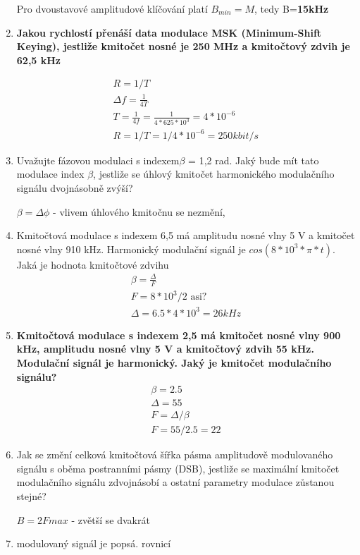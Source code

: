 \begin{enumerate}
    Pro dvoustavové amplitudové klíčování platí $B_{min}=M$, tedy B=\textbf{15kHz}
    \item \textbf{
    Jakou rychlostí přenáší data modulace MSK (Minimum-Shift Keying), jestliže kmitočet nosné 
je 250 MHz a kmitočtový zdvih je 62,5 kHz}

\begin{align*}
    R=1/T \\
    \Delta f= \frac{1}{4T}\\
    T = \frac{1}{4f}=\frac{1}{4*625*10^3}=4*10^{-6} \\
    R=1/T=1/4*10^{-6}=250kbit/s
\end{align*}

    \item Uvažujte fázovou modulaci s indexem$\beta$ = 1,2 rad. Jaký bude mít tato modulace index $\beta$, 
jestliže se úhlový kmitočet harmonického modulačního signálu dvojnásobně zvýší?

    $\beta = \Delta\phi$ - vlivem úhlového kmitočnu se nezmění,
    
    \item Kmitočtová modulace s indexem 6,5 má amplitudu nosné vlny 5 V a kmitočet nosné vlny 910 kHz. Harmonický modulační signál je $cos(8*10^3*\pi*t)$. Jaká je hodnota kmitočtové zdvihu
    \begin{align*}
        \beta=\frac{\Delta}{F} \\
        F= 8*10^3/2 \textrm{ asi?}\\
        \Delta=6.5*4*10^3= 26kHz
    \end{align*}
    \item \textbf{Kmitočtová modulace s indexem 2,5 má kmitočet nosné vlny 900 kHz, amplitudu nosné vlny 
5 V a kmitočtový zdvih 55 kHz. Modulační signál je harmonický. Jaký je kmitočet modulačního 
signálu?}   
 \begin{align*}
     \beta=2.5 \\
     \Delta=55 \\
     F=\Delta/\beta \\
     F=55/2.5=22
 \end{align*}
 
    \item Jak se změní celková kmitočtová šířka pásma amplitudově modulovaného signálu s oběma 
postranními pásmy (DSB), jestliže se maximální kmitočet modulačního signálu zdvojnásobí a 
ostatní parametry modulace zůstanou stejné?

    $B=2Fmax$ - zvětší se dvakrát
    \item modulovaný signál je popsá. rovnicí
     

\end{enumerate}
